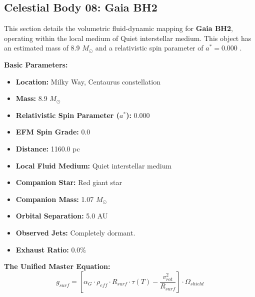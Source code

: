 \documentclass[11pt, a4paper]{article}
\begin{document}
\clearpage
\subsection{Celestial Body 08: Gaia BH2}
This section details the volumetric fluid-dynamic mapping for \textbf{Gaia BH2}, operating within the local medium of Quiet interstellar medium. This object has an estimated mass of 8.9 $M_{\odot}$ and a relativistic spin parameter of $a^* = 0.000$ \cite{el-badry2023, simbad}.

\vspace{0.5em}
\noindent \textbf{Basic Parameters:}
\begin{itemize}
  \item \textbf{Location:} Milky Way, Centaurus constellation
  \item \textbf{Mass:} 8.9 $M_{\odot}$
  \item \textbf{Relativistic Spin Parameter ($a^*$):} 0.000
  \item \textbf{EFM Spin Grade:} 0.0
  \item \textbf{Distance:} 1160.0 pc
  \item \textbf{Local Fluid Medium:} Quiet interstellar medium
  \item \textbf{Companion Star:} Red giant star
  \item \textbf{Companion Mass:} 1.07 $M_{\odot}$
  \item \textbf{Orbital Separation:} 5.0 AU
  \item \textbf{Observed Jets:} Completely dormant.
  \item \textbf{Exhaust Ratio:} 0.0\%
\end{itemize}

\vspace{0.5em}
\noindent \textbf{The Unified Master Equation:}
$$ g_{surf} = \left[ \alpha_G \cdot \rho_{eff} \cdot R_{surf} \cdot \tau(T) - \frac{v_{rot}^2}{R_{surf}} \right] \cdot \Omega_{shield} $$
\end{document}
